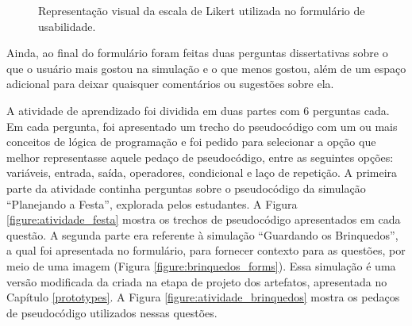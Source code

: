 \begin{figure}[h!]
    \centering
    \setlength{\fboxrule}{0.1pt} %
    \caption{Representação visual da escala de Likert utilizada no formulário de usabilidade.}
    \label{figure:likert_forms}
\end{figure}

Ainda, ao final do formulário foram feitas duas perguntas dissertativas sobre o que o usuário mais gostou na simulação e o que menos gostou, além de um espaço adicional para deixar quaisquer comentários ou sugestões sobre ela.

A atividade de aprendizado foi dividida em duas partes com 6 perguntas cada. Em cada pergunta, foi apresentado um trecho do pseudocódigo com um ou mais conceitos de lógica de programação e foi pedido para selecionar a opção que melhor representasse aquele pedaço de pseudocódigo, entre as seguintes opções: variáveis, entrada, saída, operadores, condicional e laço de repetição. A primeira parte da atividade continha perguntas sobre o pseudocódigo da simulação \enquote{Planejando a Festa}, explorada pelos estudantes. A Figura \ref{figure:atividade_festa} mostra os trechos de pseudocódigo apresentados em cada questão. A segunda parte era referente à simulação \enquote{Guardando os Brinquedos}, a qual foi apresentada no formulário, para fornecer contexto para as questões, por meio de uma imagem (Figura \ref{figure:brinquedos_forms}). Essa simulação é uma versão modificada da criada na etapa de projeto dos artefatos, apresentada no Capítulo \ref{prototypes}. A Figura \ref{figure:atividade_brinquedos} mostra os pedaços de pseudocódigo utilizados nessas questões.

